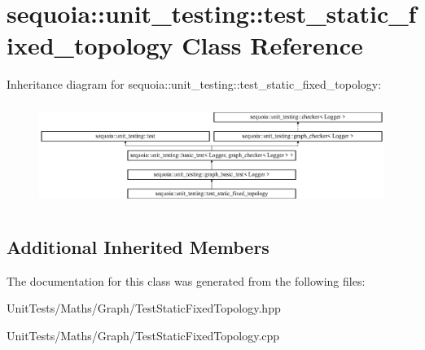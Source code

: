 \hypertarget{classsequoia_1_1unit__testing_1_1test__static__fixed__topology}{}\section{sequoia\+::unit\+\_\+testing\+::test\+\_\+static\+\_\+fixed\+\_\+topology Class Reference}
\label{classsequoia_1_1unit__testing_1_1test__static__fixed__topology}
Inheritance diagram for sequoia\+::unit\+\_\+testing\+::test\+\_\+static\+\_\+fixed\+\_\+topology\+:\begin{figure}[H]
\begin{center}
\leavevmode
\includegraphics[height=3.357314cm]{classsequoia_1_1unit__testing_1_1test__static__fixed__topology}
\end{center}
\end{figure}
\subsection*{Additional Inherited Members}


The documentation for this class was generated from the following files\+:\begin{DoxyCompactItemize}
\item 
Unit\+Tests/\+Maths/\+Graph/Test\+Static\+Fixed\+Topology.\+hpp\item 
Unit\+Tests/\+Maths/\+Graph/Test\+Static\+Fixed\+Topology.\+cpp\end{DoxyCompactItemize}
